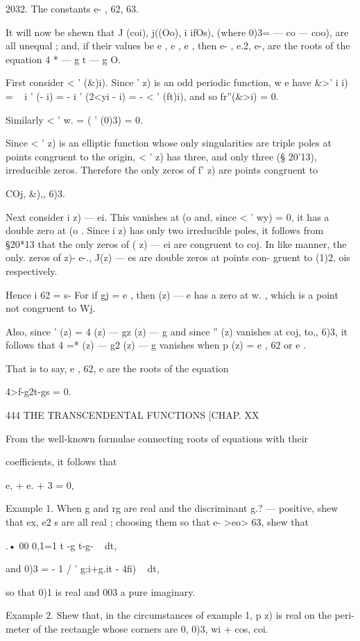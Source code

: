 {2032. The constants e- , 62, 63.

It will now be shewn that J (coi), j((Oo), i ifOs), (where 0)3= — co —
coo), are all unequal ; and, if their values be e , e , e , then e- ,
e.2, e-, are the roots of the equation 4 * — g t — g O.

First consider < ' (\&)i). Since ' z) is an odd periodic function, w e
have \&>' i i) = ~ i ' (- i) = - i ' (2<yi - i) = - < ' (ft)i), and so
fr''(\&>i) = 0.

Similarly < ' w. = ( ' (0)3) = 0.

Since < ' z) is an elliptic function whose only singularities are
triple poles at points congruent to the origin, < ' z) has three, and
only three (§ 20'13), irreducible zeros. Therefore the only zeros of
f' z) are points congruent to

COj, \&),, 6)3.

Next consider i z) — ei. This vanishes at (o and, since < ' wy) = 0,
it has a double zero at (o . Since i z) has only two irreducible
poles, it follows from §20*13 that the only zeros of ( z) — ei are
congruent to coj. In like manner, the only. zeros of z)- e-., J(z) —
es are double zeros at points con- gruent to (1)2, ois respectively.

Hence i 62 = s- For if gj = e , then (z) — e has a zero at w. , which
is a point not congruent to Wj.

Also, since ' (z) = 4 (z) — gz (z) — g and since '' (z) vanishes at
coj, to,, 6)3, it follows that 4 =* (z) — g2 (z) — g vanishes when p
(z) = e , 62 or e .

That is to say, e , 62, e are the roots of the equation

4>f-g2t-gs = 0.

444 THE TRANSCENDENTAL FUNCTIONS [CHAP. XX

From the well-known formulae connecting roots of equations with their

coefficients, it follows that

e, + e. + 3 = 0,

Example 1. When g and rg are real and the discriminant g.? — %
positive, shew that ex, e2 s are all real ; choosing them so that e-
>eo> 63, shew that

.• 00 0,1=1 t -g t-g- ~ dt,

and 0)3 = - 1 / ' g:i+g.it - 4fi) ~ dt,

so that 0)1 is real and 003 a pure imaginary.

Example 2. Shew that, in the circumstances of example 1, p z) is real
on the peri- meter of the rectangle whose corners are 0, 0)3, wi +
cos, coi.

}
